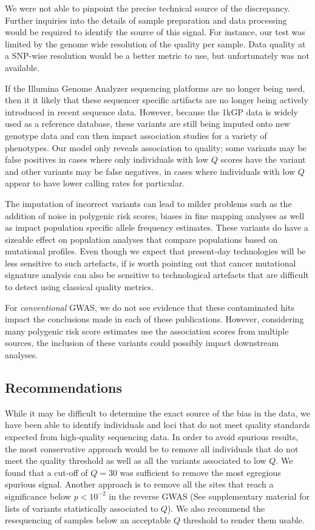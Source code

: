\documentclass[9pt,lineno]{elife}
\begin{document}
We were not able to pinpoint the precise technical source of the discrepancy. 
Further inquiries into the details of sample preparation and data processing would be required to identify the source of this signal. 
For instance, our test was limited by the genome wide resolution of the quality per sample.
Data quality at a SNP-wise resolution would be a better metric to use, but unfortunately was not available.

If the Illumina Genome Analyzer sequencing platforms are no longer being used, then it it likely that these sequencer specific artifacts are no longer being actively introduced in recent sequence data.
However, because the 1kGP data is widely used as a reference database, these variants are still being imputed onto new genotype data and can then impact association studies for a variety of phenotypes.
Our model only reveals association to quality; some variants may be false positives in cases where only individuals with low $Q$ scores have the variant and other variants may be false negatives, in cases where individuals with low $Q$ appear to have lower calling rates for particular.

The imputation of incorrect variants can lead to milder problems such as the addition of noise in polygenic risk scores, biases in fine mapping analyses as well as impact population specific allele frequency estimates.
These variants do have a sizeable effect on population analyses that compare populations based on mutational profiles. 
Even though we expect that present-day technologies will be less sensitive to such artefacts, if is worth pointing out that cancer mutational signature analysis can also be sensitive to technological artefacts that are difficult to detect using classical quality metrics. 

For \textit{conventional} GWAS, we do not see evidence that these contaminated hits impact the conclusions made in each of these publications.
However, considering many polygenic risk score estimates use the association scores from multiple sources, the inclusion of these variants could possibly impact downstream analyses.  

\subsection{Recommendations}
While it may be difficult to determine the exact source of the bias in the data, we have been able to identify individuals and loci that do not meet quality standards expected from high-quality sequencing data.
In order to avoid spurious results, the most conservative approach would be to remove all individuals that do not meet the quality threshold as well as all the variants associated to low $Q$.
We found that a cut-off of $Q = 30$ was sufficient to remove the most egregious spurious signal.
Another approach is to remove all the sites that reach a significance below $ p < 10^{-2}$ in the reverse GWAS (See supplementary material for lists of variants statistically associated to $Q$).
We also recommend the resequencing of samples below an acceptable $Q$ threshold to render them usable.
\end{document}
